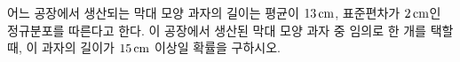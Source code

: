 어느 공장에서 생산되는 막대 모양 과자의 길이는 평균이 $13\mkern3mu \mathrm{cm}$, 표준편차가 $2\mkern3mu \mathrm{cm}$인 정규분포를 따른다고 한다. 이 공장에서 생산된 막대 모양 과자 중 임의로 한 개를 택할 때, 이 과자의 길이가 $15\mkern3mu \mathrm{cm}$ 이상일 확률을 구하시오. 
